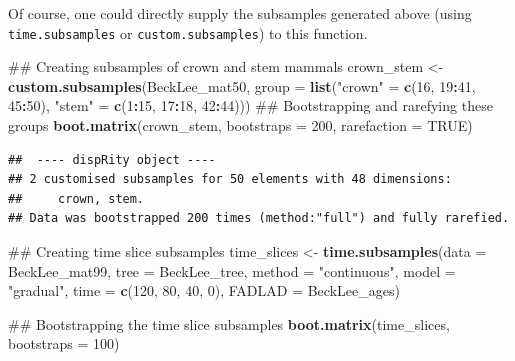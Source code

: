 \documentclass[]{book}
\newenvironment{Shaded}{\begin{snugshade}}{\end{snugshade}}
\newcommand{\KeywordTok}[1]{\textcolor[rgb]{0.13,0.29,0.53}{\textbf{#1}}}
\newcommand{\DataTypeTok}[1]{\textcolor[rgb]{0.13,0.29,0.53}{#1}}
\newcommand{\DecValTok}[1]{\textcolor[rgb]{0.00,0.00,0.81}{#1}}
\newcommand{\StringTok}[1]{\textcolor[rgb]{0.31,0.60,0.02}{#1}}
\newcommand{\OtherTok}[1]{\textcolor[rgb]{0.56,0.35,0.01}{#1}}
\newcommand{\OperatorTok}[1]{\textcolor[rgb]{0.81,0.36,0.00}{\textbf{#1}}}
\newcommand{\NormalTok}[1]{#1}
\theoremstyle{definition}
\theoremstyle{definition}
\theoremstyle{remark}
\begin{document}
Of course, one could directly supply the subsamples generated above
(using \texttt{time.subsamples} or \texttt{custom.subsamples}) to this
function.

\begin{Shaded}
\begin{Highlighting}[]
\NormalTok{## Creating subsamples of crown and stem mammals}
\NormalTok{crown_stem <-}\StringTok{ }\KeywordTok{custom.subsamples}\NormalTok{(BeckLee_mat50,}
                                \DataTypeTok{group =} \KeywordTok{list}\NormalTok{(}\StringTok{"crown"}\NormalTok{ =}\StringTok{ }\KeywordTok{c}\NormalTok{(}\DecValTok{16}\NormalTok{, }\DecValTok{19}\OperatorTok{:}\DecValTok{41}\NormalTok{, }\DecValTok{45}\OperatorTok{:}\DecValTok{50}\NormalTok{), }
                                             \StringTok{"stem"}\NormalTok{ =}\StringTok{ }\KeywordTok{c}\NormalTok{(}\DecValTok{1}\OperatorTok{:}\DecValTok{15}\NormalTok{, }\DecValTok{17}\OperatorTok{:}\DecValTok{18}\NormalTok{, }\DecValTok{42}\OperatorTok{:}\DecValTok{44}\NormalTok{)))}
\NormalTok{## Bootstrapping and rarefying these groups}
\KeywordTok{boot.matrix}\NormalTok{(crown_stem, }\DataTypeTok{bootstraps =} \DecValTok{200}\NormalTok{, }\DataTypeTok{rarefaction =} \OtherTok{TRUE}\NormalTok{)}
\end{Highlighting}
\end{Shaded}

\begin{verbatim}
##  ---- dispRity object ---- 
## 2 customised subsamples for 50 elements with 48 dimensions:
##     crown, stem.
## Data was bootstrapped 200 times (method:"full") and fully rarefied.
\end{verbatim}

\begin{Shaded}
\begin{Highlighting}[]
\NormalTok{## Creating time slice subsamples}
\NormalTok{time_slices <-}\StringTok{ }\KeywordTok{time.subsamples}\NormalTok{(}\DataTypeTok{data =}\NormalTok{ BeckLee_mat99, }\DataTypeTok{tree =}\NormalTok{ BeckLee_tree, }
                               \DataTypeTok{method =} \StringTok{"continuous"}\NormalTok{, }\DataTypeTok{model =} \StringTok{"gradual"}\NormalTok{, }
                               \DataTypeTok{time =} \KeywordTok{c}\NormalTok{(}\DecValTok{120}\NormalTok{, }\DecValTok{80}\NormalTok{, }\DecValTok{40}\NormalTok{, }\DecValTok{0}\NormalTok{),}
                               \DataTypeTok{FADLAD =}\NormalTok{ BeckLee_ages)}

\NormalTok{## Bootstrapping the time slice subsamples}
\KeywordTok{boot.matrix}\NormalTok{(time_slices, }\DataTypeTok{bootstraps =} \DecValTok{100}\NormalTok{)}
\end{Highlighting}
\end{Shaded}
\end{document}
